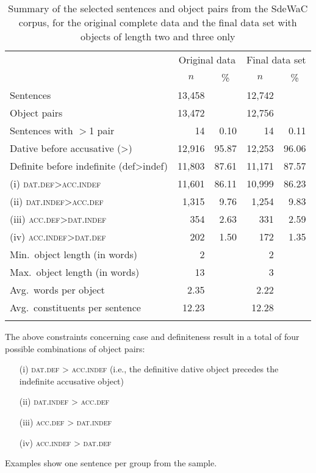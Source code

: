 \documentclass[output=paper,colorlinks,citecolor=brown]{langscibook}
\begin{document}
\begin{table}[t]
    \centering
    \begin{tabular}{lrrrr}
    \lsptoprule
    & \multicolumn{2}{c}{Original data} & \multicolumn{2}{c}{Final data set} \\\cmidrule(lr){2-3}\cmidrule(lr){4-5}
    & \multicolumn{1}{c}{$n$} & \multicolumn{1}{c}{\%} & \multicolumn{1}{c}{$n$} & \multicolumn{1}{c}{\%} \\
    \midrule
    Sentences & 13,458 && 12,742 \\
    Object pairs & 13,472 && 12,756 \\
    Sentences with $>$1 pair & 14 & 0.10 & 14 & 0.11 \\[0.5ex]
    Dative before accusative (\ReichDat{}>\ReichAcc{}) & 12,916 & 95.87 & 12,253 & 96.06 \\
    Definite before indefinite (def>indef) & 11,803 & 87.61 & 11,171 & 87.57 \\[0.5ex]
    (i) \textsc{dat.def}>\textsc{acc.indef} & 11,601 & 86.11 & 10,999 & 86.23 \\
    (ii) \textsc{dat.indef}>\textsc{acc.def} & 1,315 & 9.76 & 1,254 & 9.83 \\
    (iii) \textsc{acc.def}>\textsc{dat.indef} & 354 & 2.63 & 331 & 2.59 \\
    (iv) \textsc{acc.indef}>\textsc{dat.def} & 202 & 1.50 & 172 & 1.35 \\[0.5ex]

    Min.\ object length (in words) & 2 && 2\\
    Max.\ object length (in words) & 13 && 3\\
    Avg.\ words per object & 2.35 && 2.22 \\[0.5ex]
    Avg.\ constituents per sentence & 12.23 && 12.28 \\

    \lspbottomrule
    \end{tabular}
    \caption{Summary of the selected sentences and object pairs from the SdeWaC corpus, for the original complete data and the final data set with objects of length two and three only}
    \label{tab:data_stats}
\end{table}

The above constraints concerning case and definiteness result in a total of four possible combinations of object pairs: 

\begin{enumerate}
\item[(i)] \textsc{dat.def} > \textsc{acc.indef} (i.e., the definitive dative object precedes the indefinite accusative object)
\item[(ii)] \textsc{dat.indef} > \textsc{acc.def}
\item[(iii)] \textsc{acc.def} > \textsc{dat.indef}
\item[(iv)] \textsc{acc.indef} > \textsc{dat.def}
\end{enumerate}
Examples  show one sentence per group from the sample.
\end{document}
